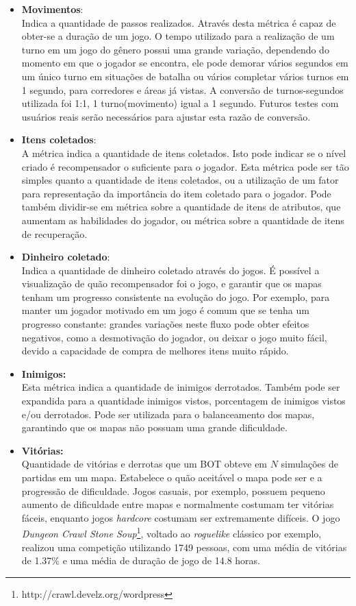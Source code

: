 \begin{itemize}
	\item \textbf{Movimentos}:\\
		Indica a quantidade de passos realizados. Através desta métrica é capaz de obter-se a duração de um jogo. O tempo utilizado para a realização de um turno em um jogo do gênero possui uma grande variação, dependendo do momento em que o jogador se encontra, ele pode demorar vários segundos em um único turno em situações de batalha ou vários completar vários turnos em 1 segundo, para corredores e áreas já vistas. A conversão de turnos-segundos utilizada foi 1:1, 1 turno(movimento) igual a 1 segundo. Futuros testes com usuários reais serão necessários para ajustar esta razão de conversão.
	\item \textbf{Itens coletados}:\\
		A métrica indica a quantidade de itens coletados. Isto pode indicar se o nível criado é recompensador o suficiente para o jogador. Esta métrica pode ser tão simples quanto a quantidade de itens coletados, ou a utilização de um fator para representação da importância do item coletado para o jogador. Pode também dividir-se em métrica sobre a quantidade de itens de atributos, que aumentam as habilidades do jogador, ou métrica sobre a quantidade de itens de recuperação. 
	\item \textbf{Dinheiro coletado}:\\
		Indica a quantidade de dinheiro coletado através do jogos. É possível a visualização de quão recompensador foi o jogo, e garantir que os mapas tenham um progresso consistente na evolução do jogo. Por exemplo, para manter um jogador motivado em um jogo é comum que se tenha um progresso constante: grandes variações neste fluxo pode obter efeitos negativos, como a desmotivação do jogador, ou deixar o jogo muito fácil, devido a capacidade de compra de melhores itens muito rápido.
	\item \textbf{Inimigos:}\\
		Esta métrica indica a quantidade de inimigos derrotados. Também pode ser expandida para a quantidade inimigos vistos, porcentagem de inimigos vistos e/ou derrotados. 
		Pode ser utilizada para o balanceamento dos mapas, garantindo que os mapas não possuam uma grande dificuldade. 
	\item \textbf{Vitórias:}\\
		Quantidade de vitórias e derrotas que um BOT obteve em $N$ simulações de partidas em um mapa. Estabelece o quão aceitável o mapa pode ser e a progressão de dificuldade. Jogos casuais, por exemplo, possuem pequeno aumento de dificuldade entre mapas e normalmente costumam ter vitórias fáceis, enquanto jogos \textit{hardcore} costumam ser extremamente difíceis. O jogo \textit{Dungeon Crawl Stone Soup}\footnote{http://crawl.develz.org/wordpress}, voltado ao \textit{roguelike} clássico por exemplo, realizou uma competição \cite{contest} utilizando 1749 pessoas, com uma média de vitórias de 1.37\% e uma média de duração de jogo de 14.8 horas. 
\end{itemize}

